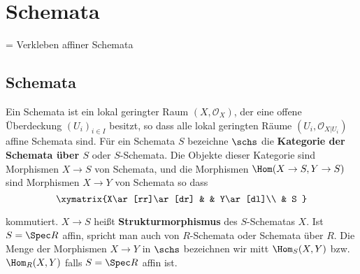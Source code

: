\chapter{Schemata}

= Verkleben affiner Schemata

\section{Schemata}
\begin{defn}
  Ein Schemata ist ein lokal geringter Raum $(X,\mathcal{O}_{X})$,
  der eine offene Überdeckung $(U_{i})_{i\in I}$ besitzt, so dass alle
  lokal geringten Räume $(U_{i},\mathcal{O}_{X|U_{i}})$ affine Schemata
  sind. Für ein Schemata $S$ bezeichne $\schs$ die \textbf{Kategorie
    der Schemata über $S$} oder $S$-Schemata. Die Objekte dieser Kategorie
  sind Morphismen $X\rightarrow S$ von Schemata, und die Morphismen
  $\Hom(X\rightarrow S,Y\rightarrow S)$ sind Morphismen $X\rightarrow Y$
  von Schemata so dass
  \[
    \xymatrix{X\ar[rr]\ar[dr] &  & Y\ar[dl]\\
      & S
    }
  \]

  kommutiert. $X\rightarrow S$ heißt \textbf{Strukturmorphismus} des
  $S$-Schematas $X$. Ist $S=\Spec R$ affin, spricht man auch von
  $R$-Schemata oder Schemata über $R$. Die Menge der Morphismen $X\rightarrow Y$
  in $\schs$ bezeichnen wir mitt $\Hom_{S}(X,Y)$ bzw. $\Hom_{R}(X,Y)$
  falls $S=\Spec R$ affin ist.
\end{defn}
